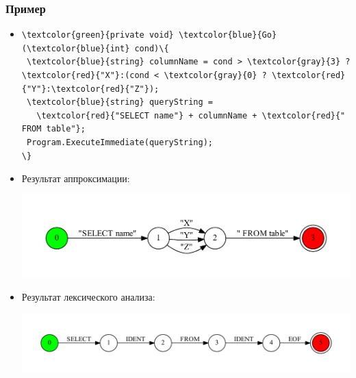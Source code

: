 \documentclass{beamer}
\begin{document}
\begin{frame}[fragile]
\transwipe[direction=90]
\frametitle{Пример}
\begin{itemize}
\item 
\begin{Verbatim}[commandchars=\\\{\}]
\textcolor{green}{private void} \textcolor{blue}{Go} (\textcolor{blue}{int} cond)\{
 \textcolor{blue}{string} columnName = cond > \textcolor{gray}{3} ? \textcolor{red}{"X"}:(cond < \textcolor{gray}{0} ? \textcolor{red}{"Y"}:\textcolor{red}{"Z"});
 \textcolor{blue}{string} queryString = 
   \textcolor{red}{"SELECT name"} + columnName + \textcolor{red}{" FROM table"};
 Program.ExecuteImmediate(queryString);
\}
\end{Verbatim}
        
\item Результат аппроксимации:
\begin{center}
    {\includegraphics[width=1.0\linewidth]{tsql_test}}
\end{center}

\item Результат лексического анализа:
\begin{center}
    {\includegraphics[width=1.0\linewidth]{tsql_test_appr}}
\end{center}
\end{itemize}
\end{frame}
\end{document}
